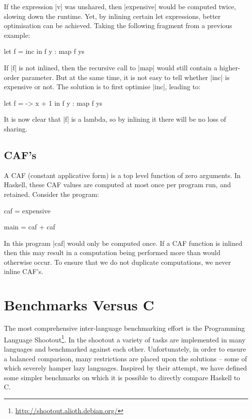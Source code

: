 \documentclass{llncs}
\begin{document}
If the expression |v| was unshared, then |expensive| would be computed twice, slowing down the runtime. Yet, by inlining certain let expressions, better optimisation can be achieved. Taking the following fragment from a previous example:

\begin{code}
let f = inc
in f y : map f ys
\end{code}

If |f| is not inlined, then the recursive call to |map| would still contain a higher-order parameter. But at the same time, it is not easy to tell whether |inc| is expensive or not. The solution is to first optimise |inc|, leading to:

\begin{code}
let f = \x -> x + 1
in f y : map f ys
\end{code}

It is now clear that |f| is a lambda, so by inlining it there will be no loss of sharing.

\subsection{CAF's}
\label{sec:caf}

A CAF (constant applicative form) is a top level function of zero arguments. In Haskell, these CAF values are computed at most once per program run, and retained. Consider the program:

\begin{code}
caf = expensive

main = caf + caf
\end{code}

In this program |caf| would only be computed once. If a CAF function is inlined then this may result in a computation being performed more than would otherwise occur. To ensure that we do not duplicate computations, we never inline CAF's.

\section{Benchmarks Versus C}
\label{sec:c_results}

The most comprehensive inter-language benchmarking effort is the Programming Language Shootout\footnote{\url{http://shootout.alioth.debian.org/}}. In the shootout a variety of tasks are implemented in many languages and benchmarked against each other. Unfortunately, in order to ensure a balanced comparison, many restrictions are placed upon the solutions -- some of which severely hamper lazy languages. Inspired by their attempt, we have defined some simpler benchmarks on which it is possible to directly compare Haskell to C.
\end{document}
